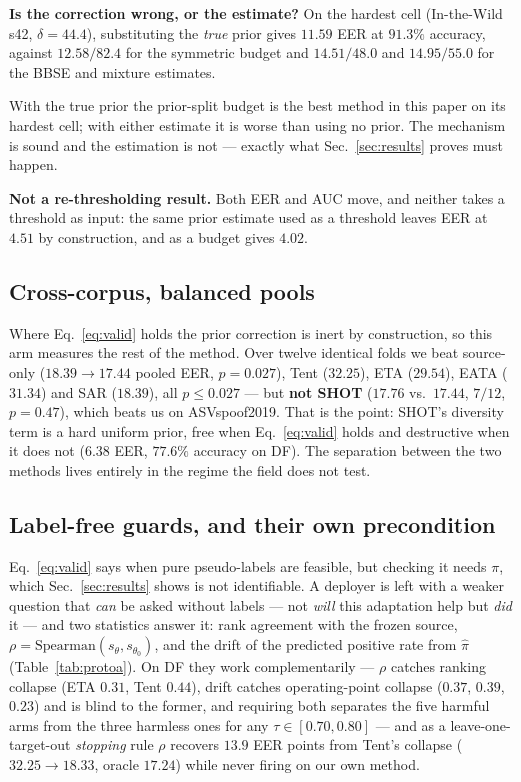\documentclass[conference]{IEEEtran}
\begin{document}
\textbf{Is the correction wrong, or the estimate?} On the hardest cell
(In-the-Wild s42, $\delta{=}44.4$), substituting the \emph{true} prior gives
$11.59$ EER at $91.3\%$ accuracy, against $12.58/82.4$ for the symmetric budget
and $14.51/48.0$ and $14.95/55.0$ for the BBSE and mixture estimates.

\noindent With the true prior the prior-split budget is the best method in this
paper on its hardest cell; with either estimate it is worse than using no prior.
The mechanism is sound and the estimation is not --- exactly what
Sec.~\ref{sec:results} proves must happen.

\textbf{Not a re-thresholding result.} Both EER and AUC move, and neither takes
a threshold as input: the same prior estimate used as a threshold leaves EER at
$4.51$ by construction, and as a budget gives $4.02$.

\subsection{Cross-corpus, balanced pools}
Where Eq.~\eqref{eq:valid} holds the prior correction is inert by construction,
so this arm measures the rest of the method. Over twelve identical folds we beat
source-only ($18.39\!\to\!17.44$ pooled EER, $p{=}0.027$), Tent ($32.25$), ETA
($29.54$), EATA ($31.34$) and SAR ($18.39$), all $p\le0.027$ --- but \textbf{not
SHOT} ($17.76$ vs.\ $17.44$, $7/12$, $p{=}0.47$), which beats us on ASVspoof2019.
That is the point: SHOT's diversity term is a hard uniform prior, free when
Eq.~\eqref{eq:valid} holds and destructive when it does not ($6.38$ EER, $77.6\%$
accuracy on DF). The separation between the two methods lives entirely in the
regime the field does not test.

\subsection{Label-free guards, and their own precondition}
Eq.~\eqref{eq:valid} says when pure pseudo-labels are feasible, but checking it
needs $\pi$, which Sec.~\ref{sec:results} shows is not identifiable. A deployer is
left with a weaker question that \emph{can} be asked without labels --- not
\emph{will} this adaptation help but \emph{did} it --- and two statistics answer
it: rank agreement with the frozen source,
$\rho=\mathrm{Spearman}(s_\theta,s_{\theta_0})$, and the drift of the predicted
positive rate from $\hat\pi$ (Table~\ref{tab:protoa}). On DF they work
complementarily --- $\rho$ catches ranking collapse (ETA $0.31$, Tent $0.44$),
drift catches operating-point collapse ($0.37$, $0.39$, $0.23$) and is blind to
the former, and requiring both separates the five harmful arms from the three
harmless ones for any $\tau\in[0.70,0.80]$ --- and as a leave-one-target-out
\emph{stopping} rule $\rho$ recovers $13.9$ EER points from Tent's collapse
($32.25\!\to\!18.33$, oracle $17.24$) while never firing on our own method.
\end{document}
